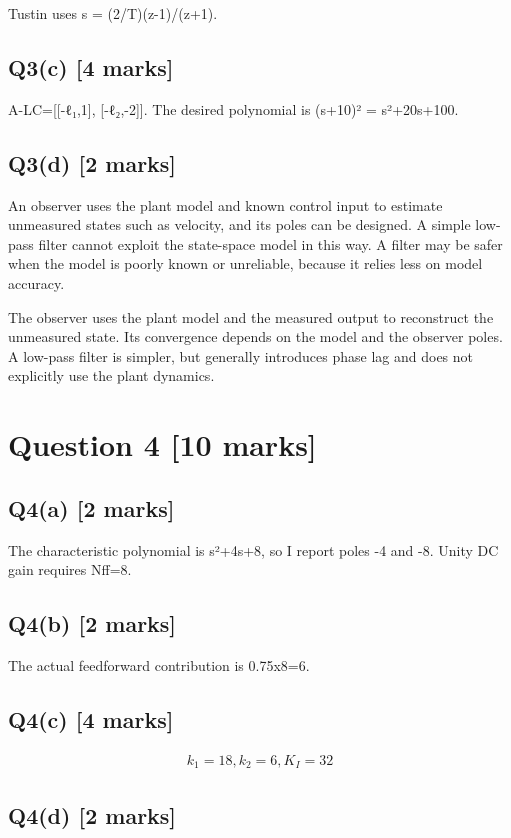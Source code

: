 \documentclass[11pt,a4paper]{article}
\begin{document}
Tustin uses s = (2/T)(z-1)/(z+1).

\subsection*{Q3(c) \hfill [4 marks]}

A-LC=[[-ℓ₁,1], [-ℓ₂,-2]].
The desired polynomial is (s+10)² = s²+20s+100.

\subsection*{Q3(d) \hfill [2 marks]}

An observer uses the plant model and known control input to estimate unmeasured states such as velocity, and its poles can be designed.
A simple low-pass filter cannot exploit the state-space model in this way.
A filter may be safer when the model is poorly known or unreliable, because it relies less on model accuracy.\par\smallskip The observer uses the plant model and the measured output to reconstruct the unmeasured state. Its convergence depends on the model and the observer poles. A low-pass filter is simpler, but generally introduces phase lag and does not explicitly use the plant dynamics.

\section*{Question 4 \hfill [10 marks]}
\subsection*{Q4(a) \hfill [2 marks]}

The characteristic polynomial is s²+4s+8, so I report poles -4 and -8.
Unity DC gain requires Nff=8.

\subsection*{Q4(b) \hfill [2 marks]}

The actual feedforward contribution is 0.75x8=6.

\subsection*{Q4(c) \hfill [4 marks]}

\[\begin{aligned}k_1=18, k_2=6, K_I=32\end{aligned}\]

\subsection*{Q4(d) \hfill [2 marks]}

\vspace{2mm}
\end{document}
